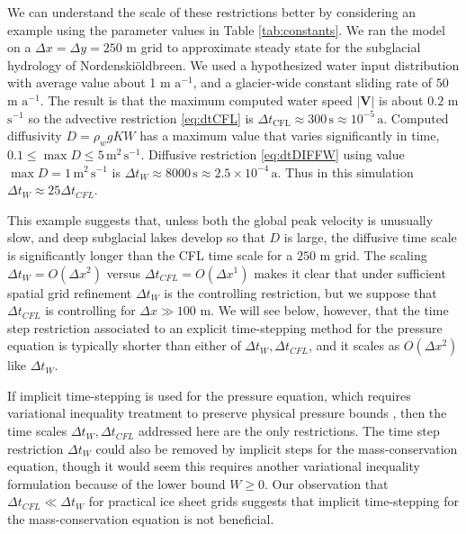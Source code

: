\documentclass[gmd]{copernicus}   %
\newcommand{\text}{\textrm}
\newcommand\bV{\mathbf{V}}
\newcommand{\Nbreen}{Nordenski\"oldbreen\xspace}
\begin{document}
We can understand the scale of these restrictions better by considering an example using the parameter values in Table \ref{tab:constants}.  We ran the model on a $\Delta x = \Delta y = 250$ m grid to approximate steady state for the subglacial hydrology of \Nbreen \citep{vanPeltthesis}.  We used a hypothesized water input distribution with average value about 1 m $\text{a}^{-1}$, and a glacier-wide constant sliding rate of $50$ m $\text{a}^{-1}$.  The result is that the maximum computed water speed $|\bV|$ is about $0.2$ m $\text{s}^{-1}$ so the advective restriction \eqref{eq:dtCFL} is $\Delta t_{\text{CFL}} \approx 300\,\text{s} \approx 10^{-5}\,\text{a}$.  Computed diffusivity $D = \rho_w g K W$ has a maximum value that varies significantly in time, $0.1 \le \max D \le 5 \,\text{m}^2\,\text{s}^{-1}$.  Diffusive restriction \eqref{eq:dtDIFFW} using value $\max D=1\,\text{m}^2\,\text{s}^{-1}$ is $\Delta t_W \approx 8000\,\text{s} \approx 2.5 \times 10^{-4}\,\text{a}$.  Thus in this simulation $\Delta t_W \approx 25 \Delta t_{CFL}$.

This example suggests that, unless both the global peak velocity is unusually slow, and deep subglacial lakes develop so that $D$ is large, the diffusive time scale is significantly longer than the CFL time scale for a $250$ m grid.  The scaling $\Delta t_W = O(\Delta x^2)$ versus $\Delta t_{CFL} = O(\Delta x^1)$ makes it clear that under sufficient spatial grid refinement $\Delta t_W$ is the controlling restriction, but we suppose that $\Delta t_{CFL}$ is controlling for $\Delta x \gg 100$ m.  We will see below, however, that the time step restriction associated to an explicit time-stepping method for the pressure equation is typically shorter than either of $\Delta t_W,\Delta t_{CFL}$, and it scales as $O(\Delta x^2)$ like $\Delta t_W$.

If implicit time-stepping is used for the pressure equation, which requires variational inequality treatment to preserve physical pressure bounds \citep{Schoofetal2012}, then the time scales $\Delta t_W, \Delta t_{CFL}$ addressed here are the only restrictions.  The time step restriction $\Delta t_W$ could also be removed by implicit steps for the mass-conservation equation, though it would seem this requires another variational inequality formulation because of the lower bound $W\ge 0$.  Our observation that $\Delta t_{CFL} \ll \Delta t_W$ for practical ice sheet grids suggests that implicit time-stepping for the mass-conservation equation is not beneficial.
\end{document}
